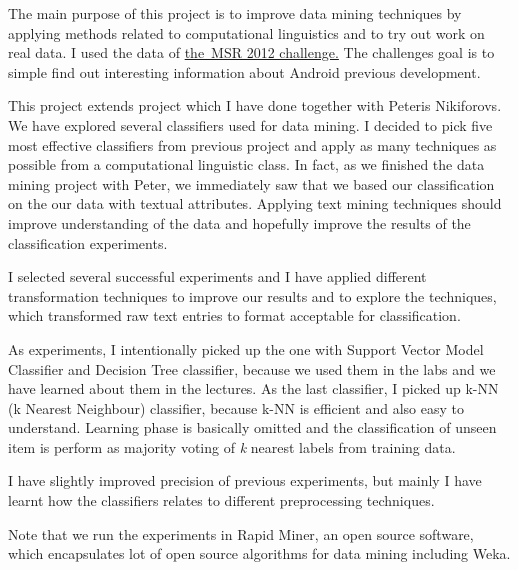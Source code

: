 
The main purpose of this project is to improve data mining techniques by applying
methods related to computational linguistics and to try out work on real data.
I used the data of 
\href{http://2012.msrconf.org/challenge.php}{the~MSR 2012 challenge.} The challenges goal is to simple find out interesting information about Android previous development.

This project extends project which I have done together with Peteris Nikiforovs. 
We have explored several classifiers used for data mining.
I decided to pick five most effective classifiers from previous project and apply 
as many techniques as possible from a computational linguistic class. 
In fact, as we finished the data mining project with Peter, we immediately saw that
we based our classification on the our data with textual attributes.
Applying text mining techniques should improve understanding of the data and hopefully
improve the results of the classification experiments.

I selected several successful experiments and I have applied different transformation techniques to improve our results
and to explore the techniques, which transformed raw text entries to format acceptable for classification.

As experiments, I intentionally picked up the one with Support Vector Model Classifier and Decision Tree classifier,
because we used them in the labs and we have learned about them in the lectures. As the last classifier, I picked up
k-NN (k Nearest Neighbour) classifier, because k-NN is efficient and also easy to understand.
Learning phase is basically omitted and the classification of unseen item is perform as majority voting
of {\it k} nearest labels from training data.

I have slightly improved precision of previous experiments, but mainly
I have learnt how the classifiers relates to different preprocessing techniques. 

Note that we run the experiments in Rapid Miner, an open source software, which encapsulates 
lot of open source algorithms for data mining including Weka. 
